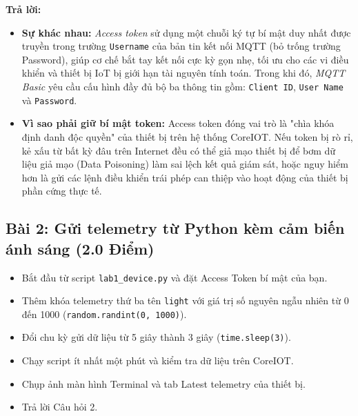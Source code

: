 \begin{tcolorbox}[colback=blue!5,colframe=blue!75!black,title=\textbf{Câu hỏi 1: Sự khác nhau giữa hai loại thông tin xác thực Access token và MQTT Basic là gì? Vì sao phải giữ bí mật token?}]
\textbf{Trả lời:}
\begin{itemize}
    \item \textbf{Sự khác nhau:} \textit{Access token} sử dụng một chuỗi ký tự bí mật duy nhất được truyền trong trường \texttt{Username} của bản tin kết nối MQTT (bỏ trống trường Password), giúp cơ chế bắt tay kết nối cực kỳ gọn nhẹ, tối ưu cho các vi điều khiển và thiết bị IoT bị giới hạn tài nguyên tính toán. Trong khi đó, \textit{MQTT Basic} yêu cầu cấu hình đầy đủ bộ ba thông tin gồm: \texttt{Client ID}, \texttt{User Name} và \texttt{Password}.
    \item \textbf{Vì sao phải giữ bí mật token:} Access token đóng vai trò là "chìa khóa định danh độc quyền" của thiết bị trên hệ thống CoreIOT. Nếu token bị rò rỉ, kẻ xấu từ bất kỳ đâu trên Internet đều có thể giả mạo thiết bị để bơm dữ liệu giả mạo (Data Poisoning) làm sai lệch kết quả giám sát, hoặc nguy hiểm hơn là gửi các lệnh điều khiển trái phép can thiệp vào hoạt động của thiết bị phần cứng thực tế.
\end{itemize}
\end{tcolorbox}

\newpage
\subsection{Bài 2: Gửi telemetry từ Python kèm cảm biến ánh sáng (2.0 Điểm)}

\begin{tcolorbox}[
    enhanced, colback=black!2, colframe=black!60, boxrule=1pt, arc=2.5mm, drop shadow,
    attach boxed title to top left={xshift=4mm, yshift=-3mm},
    boxed title style={enhanced, colback=black!85, colframe=black!85, boxrule=1pt, arc=2.5mm, drop shadow, left=6pt, right=6pt, top=2pt, bottom=2pt},
    title=\textcolor{white}{\large\textbf{Yêu cầu đề bài (Trích phiếu bài tập)}}
]
\bfseries
\vspace{0.2cm}
\begin{itemize}
    \item Bắt đầu từ script \texttt{lab1\_device.py} và đặt Access Token bí mật của bạn.
    \item Thêm khóa telemetry thứ ba tên \texttt{light} với giá trị số nguyên ngẫu nhiên từ 0 đến 1000 (\texttt{random.randint(0, 1000)}).
    \item Đổi chu kỳ gửi dữ liệu từ 5 giây thành 3 giây (\texttt{time.sleep(3)}).
    \item Chạy script ít nhất một phút và kiểm tra dữ liệu trên CoreIOT.
    \item Chụp ảnh màn hình Terminal và tab Latest telemetry của thiết bị.
    \item Trả lời Câu hỏi 2.
\end{itemize}
\end{tcolorbox}

